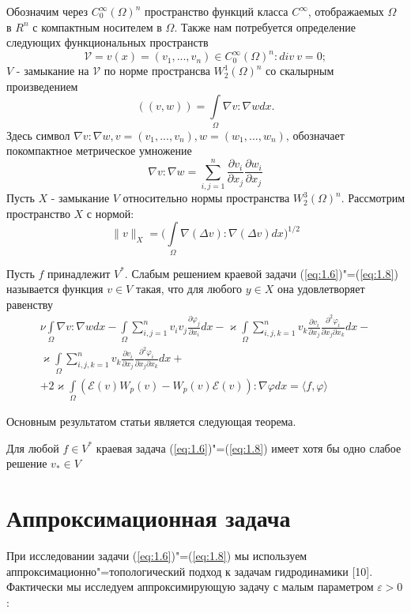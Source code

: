 Обозначим через $C_0^{\infty}(\Omega)^n$ пространство функций класса $C^{\infty}$, отображаемых $\Omega$ в $R^n$ с
компактным носителем в $\Omega$. Также нам потребуется определение следующих функциональных пространств
$$\mathcal{V}={v(x)=(v_1,...,v_n)\in C_0^{\infty}(\Omega)^n: div \ v = 0};$$
$V$ - замыкание на $\mathcal{V}$ по норме пространсва $W^1_2(\Omega)^n$
со скалырным произведением
$$((v,w))=\int\limits_{\Omega}\nabla v : \nabla w dx.$$
Здесь символ $\nabla v : \nabla w, v=(v_1,...,v_n), w=(w_1,...,w_n)$, обозначает покомпактное метрическое умножение
$$\nabla v : \nabla w = \sum_{i,j=1}^n \frac{\partial v_i}{\partial x_j}\frac{\partial w_i}{\partial x_j} $$
Пусть $X$ - замыкание $V$ относительно нормы пространства $W_2^3(\Omega)^n$. Рассмотрим пространство $X$ с нормой:
$$\parallel v\parallel_{X}=\bigg(\int\limits_{\Omega}\nabla(\Delta v):\nabla(\Delta v)dx\bigg)^{1/2}$$

\begin{definition}
    Пусть $f$ принадлежит $V^*$. Слабым решением краевой задачи (\ref{eq:1.6})"=(\ref{eq:1.8}) называется функция $v\in V$ такая,
    что для любого $y\in X$ она удовлетворяет равенству
    \begin{equation}\label{eq:2.1}
        \begin{gathered}
            \nu\int\limits_{\Omega}\nabla v: \nabla w dx-\int\limits_{\Omega} \sum_{i,j=1}^n v_iv_j\frac{\partial \varphi_j}
            {\partial x_i}dx-\varkappa\int\limits_{\Omega}\sum_{i,j,k=1}^n v_k\frac{\partial v_i}{\partial x_j}\frac{\partial^2 \varphi_i}{\partial x_j\partial x_k}dx- \\
            \varkappa\int\limits_{\Omega}\sum_{i,j,k=1}^n v_k\frac{\partial v_i}{\partial x_j}\frac{\partial^2 \varphi_i}
            {\partial x_j\partial x_k}dx+\\
            +2\varkappa\int\limits_{\Omega}(\mathcal{E}(v)W_p(v)-W_p(v)\mathcal{E}(v)):
            \nabla\varphi dx=\langle f,\varphi \rangle
        \end{gathered}
    \end{equation}
\end{definition}
Основным результатом статьи является следующая теорема.

\begin{theorem}
    Для любой $f\in V^*$ краевая задача (\ref{eq:1.6})"=(\ref{eq:1.8}) имеет хотя бы одно слабое решение $v_*\in V$
\end{theorem}

\section{Аппроксимационная задача}
При исследовании задачи (\ref{eq:1.6})"=(\ref{eq:1.8}) мы используем аппроксимационно"=топологический подход к задачам гидродинамики [10].
Фактически мы исследуем аппроксимирующую задачу с малым параметром $\varepsilon > 0$:

